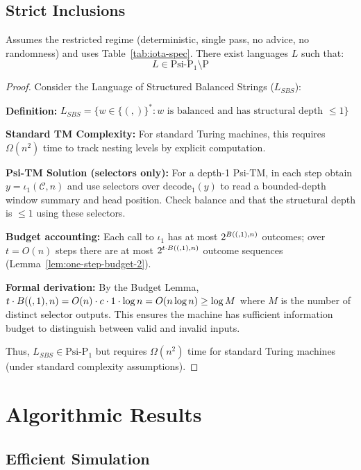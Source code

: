 \subsection{Strict Inclusions}

\begin{theorem}
Assumes the restricted regime (deterministic, single pass, no advice, no randomness) and uses Table~\ref{tab:iota-spec}.
There exist languages $L$ such that:
$$L \in \text{Psi-P}_1 \setminus \text{P}$$
\end{theorem}

\begin{proof}
Consider the Language of Structured Balanced Strings ($L_{SBS}$):

\textbf{Definition:} $L_{SBS} = \{w \in \{(,)\}^* : w \text{ is balanced and has structural depth } \leq 1\}$

\textbf{Standard TM Complexity:}
For standard Turing machines, this requires $\Omega(n^2)$ time to track nesting levels by explicit computation.

\textbf{Psi-TM Solution (selectors only):}
For a depth-1 Psi-TM, in each step obtain $y=\iota_1(\mathcal{C},n)$ and use selectors over $\mathrm{decode}_1(y)$ to read a bounded-depth window summary and head position. Check balance and that the structural depth is $\le 1$ using these selectors.

\textbf{Budget accounting:}
Each call to $\iota_1$ has at most $2^{B((,1),n)}$ outcomes; over $t=O(n)$ steps there are at most $2^{t\cdot B((,1),n)}$ outcome sequences (Lemma~\ref{lem:one-step-budget-2}).

\textbf{Formal derivation:} By the Budget Lemma, $t \cdot B((,1),n) = O(n) \cdot c \cdot 1 \cdot \log n = O(n \log n) \ge \log M$ where $M$ is the number of distinct selector outputs. This ensures the machine has sufficient information budget to distinguish between valid and invalid inputs.

Thus, $L_{SBS} \in \text{Psi-P}_1$ but requires $\Omega(n^2)$ time for standard Turing machines (under standard complexity assumptions).
\end{proof}

\section{Algorithmic Results}

\subsection{Efficient Simulation}

